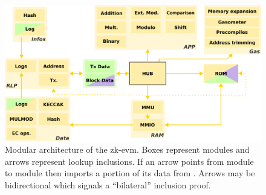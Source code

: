 \begin{figure}
    \includegraphics[width = \textwidth]{../img/zkevm_better_arrow_heads.png}
\caption{Modular architecture of the zk-evm. Boxes represent modules and arrows represent lookup inclusions. If an arrow points from module  to module  then  imports a portion of its data from .  Arrows may be bidirectional which signals a ``bilateral'' inclusion proof.}
\end{figure}
